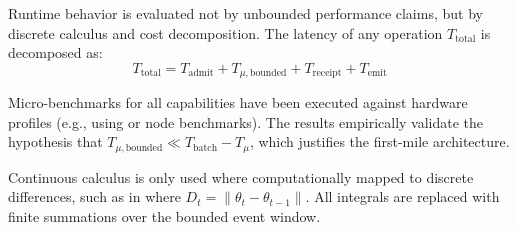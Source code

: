 Runtime behavior is evaluated not by unbounded performance claims, but by discrete calculus and cost decomposition. The latency of any operation $T_{\mathrm{total}}$ is decomposed as:
\[ T_{\mathrm{total}} = T_{\mathrm{admit}} + T_{\mu,\mathrm{bounded}} + T_{\mathrm{receipt}} + T_{\mathrm{emit}} \]

Micro-benchmarks for all capabilities have been executed against hardware profiles (e.g., using  or node benchmarks). The results empirically validate the hypothesis that $T_{\mu,\mathrm{bounded}} \ll T_{\mathrm{batch}} - T_{\mu}$, which justifies the first-mile architecture.

Continuous calculus is only used where computationally mapped to discrete differences, such as in  where $D_t = \|\theta_t - \theta_{t-1}\|$. All integrals are replaced with finite summations over the bounded event window.
